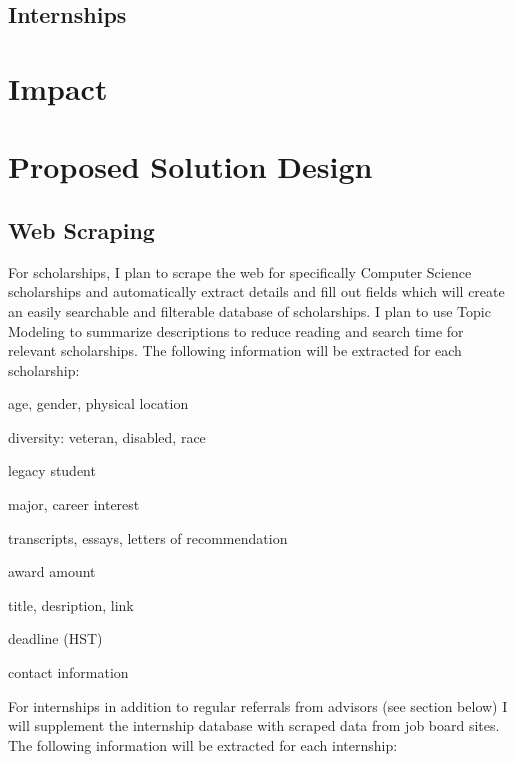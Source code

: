 \documentclass[english]{proposalnsf}
\begin{document}
	
	\subsection{Internships}
	

	
	\section{Impact}
	\label{impact}
	
	
	\section{Proposed Solution Design}
	\label{solution-design}
	
		\subsection{Web Scraping}
		For scholarships, I plan to scrape the web for specifically Computer Science scholarships and automatically extract details and fill out fields which will create an easily searchable and filterable database of scholarships. I plan to use Topic Modeling to summarize descriptions to reduce reading and search time for relevant scholarships. The following information will be extracted for each scholarship:
		\begin{Demographic Requirements}
			\item age, gender, physical location
			\item diversity: veteran, disabled, race
			\item legacy student
			\item major, career interest
		\end{Demographic Requirements}
	
			\begin{Application Requirements}
				\item transcripts, essays, letters of recommendation
			\end{Application Requirements}
		
			\begin{Information }
			\item award amount
			\item title, desription, link
			\item deadline (HST)
			\item contact information
		\end{Information }
		
		
		For internships in addition to regular referrals from advisors (see section below) I will supplement the internship database with scraped data from job board sites. The following information will be extracted for each internship:
		
\end{document}
